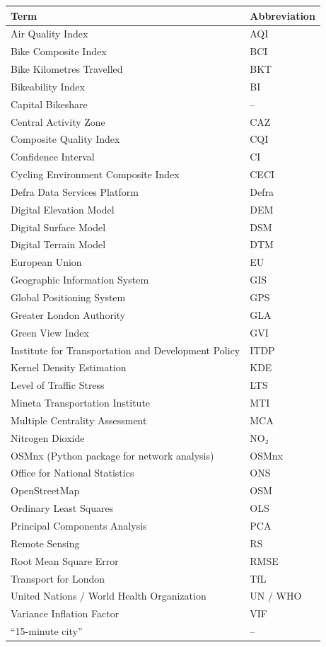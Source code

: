 \documentclass[
  12pt,
  oneside]{book}
\begin{document}
\begin{table}
\centering
\begin{tabular}{ll}
\toprule
\textbf{Term} & \textbf{Abbreviation}\\
\midrule
Air Quality Index & AQI\\
Bike Composite Index & BCI\\
Bike Kilometres Travelled & BKT\\
Bikeability Index & BI\\
Capital Bikeshare & –\\
\addlinespace
Central Activity Zone & CAZ\\
Composite Quality Index & CQI\\
Confidence Interval & CI\\
Cycling Environment Composite Index & CECI\\
Defra Data Services Platform & Defra\\
\addlinespace
Digital Elevation Model & DEM\\
Digital Surface Model & DSM\\
Digital Terrain Model & DTM\\
European Union & EU\\
Geographic Information System & GIS\\
\addlinespace
Global Positioning System & GPS\\
Greater London Authority & GLA\\
Green View Index & GVI\\
Institute for Transportation and Development Policy & ITDP\\
Kernel Density Estimation & KDE\\
\addlinespace
Level of Traffic Stress & LTS\\
Mineta Transportation Institute & MTI\\
Multiple Centrality Assessment & MCA\\
Nitrogen Dioxide & NO₂\\
OSMnx (Python package for network analysis) & OSMnx\\
\addlinespace
Office for National Statistics & ONS\\
OpenStreetMap & OSM\\
Ordinary Least Squares & OLS\\
Principal Components Analysis & PCA\\
Remote Sensing & RS\\
\addlinespace
Root Mean Square Error & RMSE\\
Transport for London & TfL\\
United Nations / World Health Organization & UN / WHO\\
Variance Inflation Factor & VIF\\
“15-minute city” & –\\
\bottomrule
\end{tabular}
\end{table}
\end{document}
